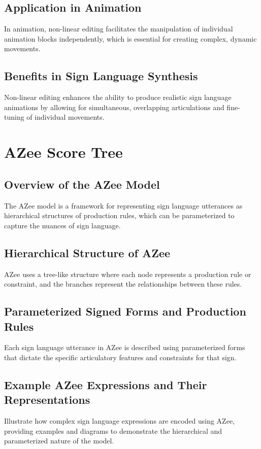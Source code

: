 \subsection{Application in Animation}
In animation, non-linear editing facilitates the manipulation of individual animation blocks independently, which is essential for creating complex, dynamic movements.

\subsection{Benefits in Sign Language Synthesis}
Non-linear editing enhances the ability to produce realistic sign language animations by allowing for simultaneous, overlapping articulations and fine-tuning of individual movements.

\section{AZee Score Tree}
\subsection{Overview of the AZee Model}
The AZee model is a framework for representing sign language utterances as hierarchical structures of production rules, which can be parameterized to capture the nuances of sign language.

\subsection{Hierarchical Structure of AZee}
AZee uses a tree-like structure where each node represents a production rule or constraint, and the branches represent the relationships between these rules.

\subsection{Parameterized Signed Forms and Production Rules}
Each sign language utterance in AZee is described using parameterized forms that dictate the specific articulatory features and constraints for that sign.

\subsection{Example AZee Expressions and Their Representations}
Illustrate how complex sign language expressions are encoded using AZee, providing examples and diagrams to demonstrate the hierarchical and parameterized nature of the model.

